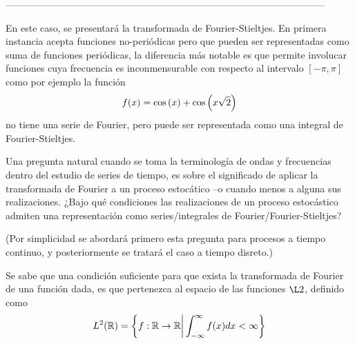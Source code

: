 ---------------------------------------------------------------------------------------------------


En este caso, se presentar\'a la transformada de Fourier-Stieltjes. En primera instancia
acepta funciones no-peri\'odicas pero que pueden ser representadas como suma de funciones
peri\'odicas, la diferencia m\'as notable es que permite involucar funciones cuya frecuencia
es inconmensurable con respecto al intervalo $[-\pi,\pi]$ como por ejemplo la funci\'on
$$
f(x) = \mathrm{cos}\left( x \right) + \mathrm{cos}\left( x\sqrt{2} \right)
$$
no tiene una serie de Fourier, pero puede ser representada como una integral de Fourier-Stieltjes.


Una pregunta natural cuando se toma la terminolog\'ia de ondas y frecuencias dentro
del estudio de series de tiempo, es sobre el significado de aplicar la transformada de Fourier a
un proceso estoc\'atico --o cuando menos a alguna sus realizaciones.
¿Bajo qu\'e condiciones las realizaciones de un proceso estoc\'astico admiten una representaci\'on
como series/integrales de Fourier/Fourier-Stieltjes?

(Por simplicidad se abordar\'a primero esta pregunta para procesos a tiempo continuo, y 
posteriormente se tratar\'a el caso a tiempo disreto.)

Se sabe que una condici\'on suficiente para que exista la transformada de Fourier de una funci\'on
dada, es que pertenezca al espacio de las funciones $\L2$, definido como
\begin{equation*}
L^2(\mathbb{R}) = \left\{ f: \mathbb{R} \rightarrow \mathbb{R} {\biggr\rvert} \int_{-\infty}^{\infty} f(x) dx < \infty \right\}
\end{equation*}

